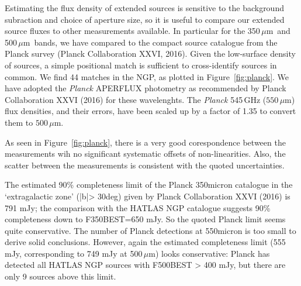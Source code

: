 \documentclass[a4paper,fleqn,usenatbib, twocolumn]{aastex61}
\def\mic{\,$\mu $m}
\begin{document}
Estimating the  flux density of extended sources is sensitive to the
background subraction and choice of aperture size, so it is useful to
compare our extended source fluxes to other measurements available. In
particular for the 350\mic\ and 500\mic\ bands, we have compared to the
compact source catalogue from the Planck survey (Planck Collaboration
XXVI, 2016).  Given the low-surface density of sources, a simple
positional match is sufficient to cross-identify sources in common. We
find 44 matches in the NGP, as plotted in Figure~\ref{fig:planck}.
We have
adopted the \textit{Planck} APERFLUX photometry as recommended by
Planck Collaboration XXVI (2016) for these wavelenghts. The
\textit{Planck} 545\,GHz ($550\,\mu$m) flux densities, and their
errors, have been scaled up by a factor of 1.35 to convert them to
$500\,\mu$m.

As seen in Figure~\ref{fig:planck}, there is a very good
corespondence between the measurements wih no significant systematic
offsets of non-linearities. Also, the scatter between the measurements
is consistent with the quoted uncertainties.

The estimated 90\% completeness limit of the Planck 350micron
catalogue in the `extragalactic zone' (|b|> 30deg) given by Planck
Collaboration XXVI (2016) is 791 mJy; the comparison with the HATLAS
NGP catalogue suggests 90\% completeness down to F350BEST=650 mJy. So
the quoted Planck limit seems quite conservative. The number of Planck
detections at 550micron is too small to derive solid
conclusions. However, again the estimated completeness limit (555 mJy,
corresponding to 749 mJy at 500\mic) looks conservative: Planck has
detected all HATLAS NGP sources with F500BEST > 400 mJy, but there are
only 9 sources above this limit.


\end{document}
